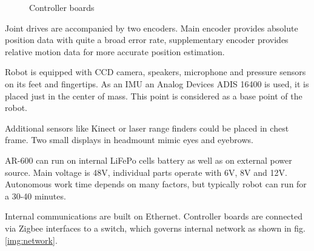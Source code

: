 \documentclass[letterpaper, 10 pt, conference]{ieeeconf}  %
\begin{document}
\begin{figure}[thpb]
\centering
{}
\caption{Controller boards}
\label{img:electronics}
\end{figure}

Joint drives are accompanied by two encoders. Main encoder provides absolute
position data with quite a broad error rate, supplementary encoder provides
relative motion data for more accurate position estimation.
 
Robot is equipped with CCD camera, speakers, microphone and pressure sensors
on its feet and fingertips. As an IMU an Analog Devices ADIS 16400 is used, it
is placed just in the center of mass. This point is considered as a base point of the robot. 

Additional sensors like Kinect or laser range finders could be placed in chest
frame. Two small displays in headmount mimic eyes and eyebrows.

AR-600 can run on internal LiFePo cells battery as well as on external power
source. Main voltage is 48V, individual parts operate with 6V, 8V and 12V.
Autonomous work time depends on many factors, but typically robot can run for a
30-40 minutes.

Internal communications are built on Ethernet. Controller boards are connected
via Zigbee interfaces to a switch, which governs internal network as shown
in fig. \ref{img:network}.
\end{document}
